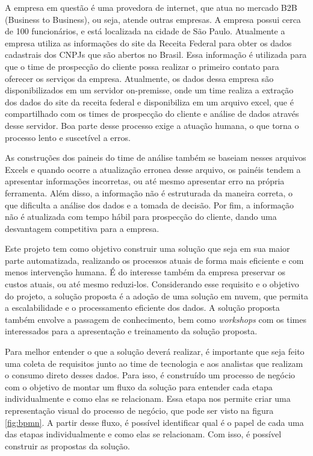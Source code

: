 A empresa em questão é uma provedora de internet, que atua no mercado B2B (Business to Business), ou seja, atende outras empresas. A empresa possui cerca de 100 funcionários, e está localizada na cidade de São Paulo. Atualmente a empresa utiliza as informações do site da Receita Federal para obter os dados cadastrais dos CNPJs que são abertos no Brasil. Essa informação é utilizada para que o time de prospecção do cliente possa realizar o primeiro contato para oferecer os serviços da empresa. Atualmente, os dados dessa empresa são disponibilizados em um servidor on-premisse, onde um time realiza a extração dos dados do site da receita federal e disponibiliza em um arquivo excel, que é compartilhado com os times de prospecção do cliente e análise de dados através desse servidor. Boa parte desse processo exige a atuação humana, o que torna o processo lento e suscetível a erros. 

As construções dos paineis do time de análise também se baseiam nesses arquivos Excels e quando ocorre a atualização erronea desse arquivo, os painéis tendem a apresentar informações incorretas, ou até mesmo apresentar erro na própria ferramenta. Além disso, a informação não é estruturada da maneira correta, o que dificulta a análise dos dados e a tomada de decisão. Por fim, a informação não é atualizada com tempo hábil para prospecção do cliente, dando uma desvantagem competitiva para a empresa.

Este projeto tem como objetivo construir uma solução que seja em sua maior parte automatizada, realizando os processos atuais de forma 
mais eficiente e com menos intervenção humana. É do interesse também da empresa preservar os custos atuais, ou até mesmo reduzi-los. Considerando esse requisito e o objetivo do projeto, a solução proposta é a adoção de uma solução em nuvem, que permita a escalabilidade e o processamento eficiente dos dados. A solução proposta também envolve a passagem de conhecimento, bem como \textit{workshops} com os times interessados para a apresentação e treinamento da solução proposta.

Para melhor entender o que a solução deverá realizar, é importante que seja feito uma coleta de requisitos junto ao time de tecnologia e aos analistas que realizam o consumo direto desses dados. Para isso, é construído um processo de negócio com o objetivo de montar um fluxo da solução para entender cada etapa individualmente e como elas se relacionam. Essa etapa nos permite criar uma representação visual do processo de negócio, que pode ser visto na figura \ref{fig:bpmn}. A partir desse fluxo, é possível identificar qual é o papel de cada uma das etapas individualmente e como elas se relacionam. Com isso, é possível construir as propostas da solução.

